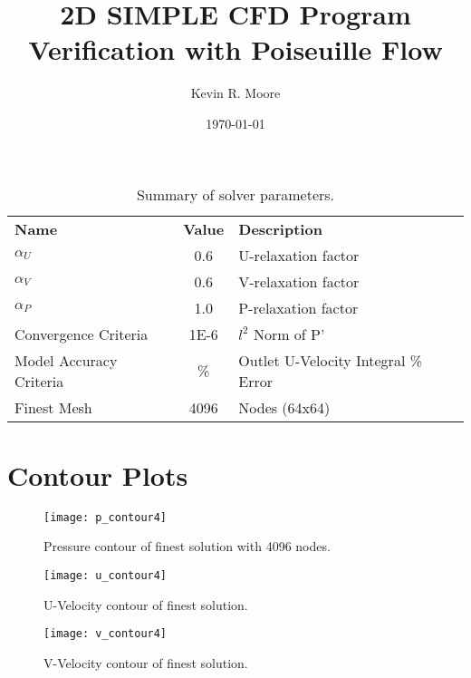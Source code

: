 \documentclass[10pt,english]{article}
\title{\vspace{-20pt}2D SIMPLE CFD Program Verification with Poiseuille Flow}
\author{Kevin R. Moore}
\affil{\vspace{-10pt}Brigham Young University}
\date{\today}
\begin{document}
\maketitle
\vspace{-30pt}

\begin{table*}[h]
\vspace{20pt}
\centering
  \begin{tabular}{lcl}
    \textbf{Name} & \textbf{Value} & \textbf{Description}  \\
    $\alpha_{U}$ & 0.6 & U-relaxation factor  \\
    $\alpha_{V}$ & 0.6 & V-relaxation factor  \\
    $\alpha_{P}$ & 1.0 & P-relaxation factor  \\
    Convergence Criteria  & 1E-6 & $l^2$ Norm of P' \\
    Model Accuracy Criteria  & \% & Outlet U-Velocity Integral \% Error  \\
    Finest Mesh  & 4096 & Nodes (64x64) \\

  \end{tabular}
  \caption{Summary of solver parameters.}
  \label{tab:params}
\end{table*}

\vspace{-20pt}

\section{Contour Plots}

\begin{figure}[H]
\centering
\texttt{[image: p\_contour4]}
\vspace{-5pt}
\caption{Pressure contour of finest solution with 4096 nodes.}
\label{f:3b}
\end{figure}

\vspace{-10pt}
\begin{figure}[H]
\centering
\texttt{[image: u\_contour4]}
\vspace{-5pt}
\caption{U-Velocity contour of finest solution.}
\label{f:3b}
\end{figure}

\vspace{-10pt}
\begin{figure}[H]
\centering
\texttt{[image: v\_contour4]}
\vspace{-5pt}
\caption{V-Velocity contour of finest solution.}
\label{f:3b}
\end{figure}
\end{document}
